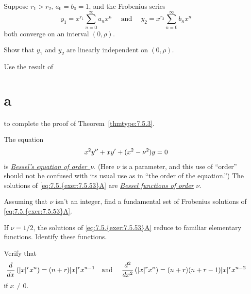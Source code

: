 \begin{exerciselist}
  \item\label{exer:7.5.52} Suppose $r_{1}>r_{2}$, $a_{0}=b_{0}=1$, and the Frobenius series
  \[
    y_{1}=x^{r_{1}}\sum_{n=0}^{\infty}a_{n}x^{n}\quad\mbox{ and }\quad y_{2}=x^{r_{2}}\sum_{n=0}^{\infty}b_{n}x^{n}
  \]
  both converge on an interval $(0,\rho)$.

  \begin{alist}
    \item %
    Show that $y_{1}$ and $y_{2}$ are linearly independent on $(0,\rho)$. 

    \item %
    Use the result of \part{a} to complete the proof of Theorem~\ref{thmtype:7.5.3}.
  \end{alist}

  \item\label{exer:7.5.53} The equation
  \setcounter{equation}{0}
  \begin{equation}
    \label{eq:7.5.{exer:7.5.53}A}x^{2}y''+xy'+(x^{2}-\nu^{2})y=0
  \end{equation}
  is \href{https://mathshistory.st-andrews.ac.uk/Biographies/Bessel/}{\color{blue}
  \it Bessel's equation of order~$\nu$\/}. (Here $\nu$ is a parameter, and this use of ``order''
  should not be confused with its usual use as in ``the order of the equation.'') The solutions of
  \eqref{eq:7.5.{exer:7.5.53}A} are
  \href{https://mathshistory.st-andrews.ac.uk/Biographies/Bessel/}{\color{blue}
  \it Bessel functions of order\/} $\nu$.
  \begin{alist}
    \item %
    Assuming that $\nu$ isn't an integer, find a fundamental set of Frobenius solutions of
    \eqref{eq:7.5.{exer:7.5.53}A}.

    \item %
    If $\nu=1/2$, the solutions of \eqref{eq:7.5.{exer:7.5.53}A} reduce to familiar elementary
    functions. Identify these functions.
  \end{alist}

  \item\label{exer:7.5.54}
  \begin{alist}
    \item %
    Verify that
    \[
      \frac{d}{dx}\left(|x|^{r}x^{n}\right)=(n+r)|x|^{r}x^{n-1}\mbox{\quad and \quad}{\frac{d^{2}}{dx^{2}}}\left(|x|^{r}x^{n}\right)=(n+r)(n+r-1)|x|^{r}x^{n-2}
    \]
    if $x\ne0$.


\end{alist}
\end{exerciselist}
